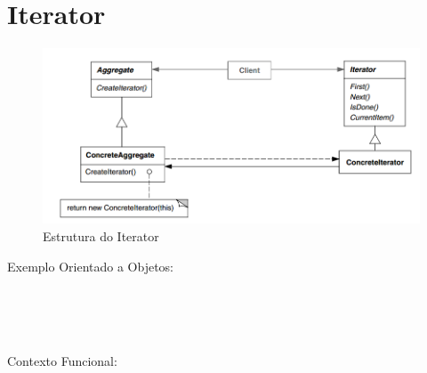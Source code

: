 \section{Iterator}

\begin{figure}[htb]
	\caption{\label{iterator_struct}Estrutura do Iterator}
	\begin{center}
	    \includegraphics[scale=0.5]{5_padroes-contexto-funcional/5.3_comportamentais/5.3.04_iterator/diagram.png}
	\end{center}
\end{figure}

Exemplo Orientado a Objetos:

\begin{lstlisting}[caption={Iterator Orientação a Objetos},label=ooiterator]


    
\end{lstlisting}

Contexto Funcional:


\begin{lstlisting}[caption={Iterator Funcional},label=fpiterator]
    

    
\end{lstlisting}
